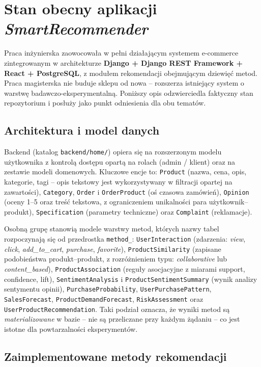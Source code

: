 \documentclass[12pt,a4paper]{article}
\begin{document}
\section{Stan obecny aplikacji \emph{SmartRecommender}}

Praca inżynierska zaowocowała w pełni działającym systemem e-commerce zintegrowanym w architekturze \textbf{Django + Django REST Framework + React + PostgreSQL}, z modułem rekomendacji obejmującym dziewięć metod. Praca magisterska nie buduje sklepu od nowa -- rozszerza istniejący system o warstwę badawczo-eksperymentalną. Poniższy opis odzwierciedla faktyczny stan repozytorium i posłuży jako punkt odniesienia dla obu tematów.

\subsection*{Architektura i model danych}

Backend (katalog \texttt{backend/home/}) opiera się na rozszerzonym modelu użytkownika z kontrolą dostępu opartą na rolach (admin / klient) oraz na zestawie modeli domenowych. Kluczowe encje to: \texttt{Product} (nazwa, cena, opis, kategorie, tagi -- opis tekstowy jest wykorzystywany w filtracji opartej na zawartości), \texttt{Category}, \texttt{Order} i \texttt{OrderProduct} (oś czasowa zamówień), \texttt{Opinion} (oceny 1--5 oraz treść tekstowa, z ograniczeniem unikalności para użytkownik--produkt), \texttt{Specification} (parametry techniczne) oraz \texttt{Complaint} (reklamacje).

Osobną grupę stanowią modele warstwy metod, których nazwy tabel rozpoczynają się od przedrostka \texttt{method\_}: \texttt{UserInteraction} (zdarzenia: \emph{view}, \emph{click}, \emph{add\_to\_cart}, \emph{purchase}, \emph{favorite}), \texttt{ProductSimilarity} (zapisane podobieństwa produkt--produkt, z rozróżnieniem typu: \emph{collaborative} lub \emph{content\_based}), \texttt{ProductAssociation} (reguły asocjacyjne z miarami support, confidence, lift), \texttt{SentimentAnalysis} i \texttt{ProductSentimentSummary} (wynik analizy sentymentu opinii), \texttt{PurchaseProbability}, \texttt{UserPurchasePattern}, \texttt{SalesForecast}, \texttt{ProductDemandForecast}, \texttt{RiskAssessment} oraz \texttt{UserProductRecommendation}. Taki podział oznacza, że wyniki metod są \emph{materializowane} w bazie -- nie są przeliczane przy każdym żądaniu -- co jest istotne dla powtarzalności eksperymentów.

\subsection*{Zaimplementowane metody rekomendacji}
\end{document}
